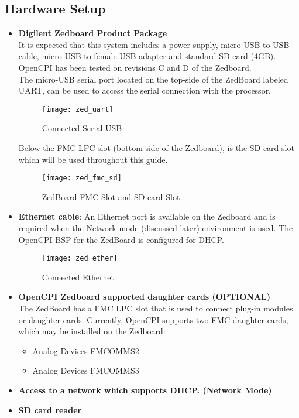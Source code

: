 \begin{flushleft}
\subsection{Hardware Setup}
\begin{itemize}
\item \textbf{Digilent Zedboard Product Package}\\ \medskip
It is expected that this system includes a power supply, micro-USB to USB cable, micro-USB to female-USB adapter and standard SD card (4GB). \\ \medskip
OpenCPI has been tested on revisions C and D of the Zedboard.\\ \medskip
The micro-USB serial port located on the top-side of the ZedBoard labeled UART, can be used to access the serial connection with the processor.\medskip

\begin{figure}[H]
	\centerline{\texttt{[image: zed\_uart]}}
	\caption{Connected Serial USB}
	\label{fig:zed_uart}
\end{figure}

Below the FMC LPC slot (bottom-side of the Zedboard), is the SD card slot which will be used throughout this guide.
\begin{figure}[H]
	\centerline{\texttt{[image: zed\_fmc\_sd]}}
	\caption{ZedBoard FMC Slot and SD card Slot}
	\label{fig:zed_fmc_sd}
\end{figure}

\item \textbf{Ethernet cable}:
An Ethernet port is available on the Zedboard and is required when the Network mode (discussed later) environment is used. The OpenCPI BSP for the ZedBoard is configured for DHCP.\medskip

\begin{figure}[H]
	\centerline{\texttt{[image: zed\_ether]}}
	\caption{Connected Ethernet}
	\label{fig:zed_ether}
\end{figure}

\item \textbf{OpenCPI Zedboard supported daughter cards (OPTIONAL)}\\
The ZedBoard has a FMC LPC slot that is used to connect plug-in modules or daughter cards. Currently, OpenCPI supports two FMC daughter cards, which may be installed on the Zedboard:
\begin{itemize}
	\item Analog Devices FMCOMMS2
	\item Analog Devices FMCOMMS3
\end{itemize} \medskip

\item \textbf{Access to a network which supports DHCP. (Network Mode)}

\item \textbf{SD card reader}
\end{itemize}
\end{flushleft}

